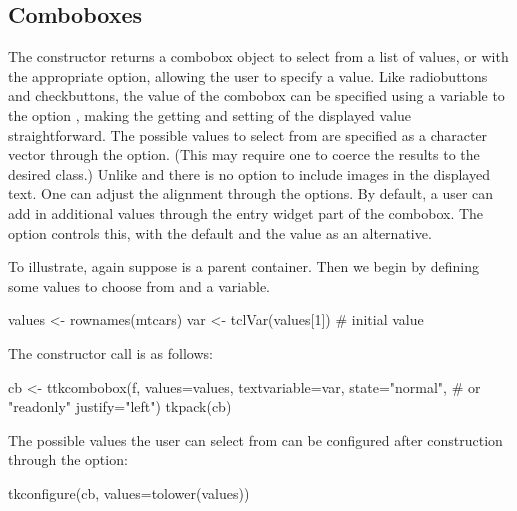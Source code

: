 \subsection{Comboboxes}
\label{sec:tcltk:comboboxes}

The  constructor returns a combobox object to
select from a list of values, or with the appropriate option, allowing
the user to specify a value. Like radiobuttons and checkbuttons, the
value of the combobox can be specified using a \TCL\/ variable to the
option , making the getting and
setting of the displayed value straightforward. The possible values to
select from are specified as a character vector through the
 option. (This may require one to coerce
the results to the desired class.) Unlike \GTK{} and \Qt{} there is no option to
include images in the displayed text. One can adjust the alignment
through the  options.  By default, a user
can add in additional values through the entry widget part of the
combobox. The  option controls this, with
the default   and the value  as an
alternative.

To illustrate, again suppose  is a parent container. Then we
begin by defining some values to choose from and a \TCL\/ variable.


\begin{Schunk}
\begin{Sinput}
 values <- rownames(mtcars)
 var <- tclVar(values[1])                # initial value
\end{Sinput}
\end{Schunk}

The constructor call is as follows:
\begin{Schunk}
\begin{Sinput}
 cb <- ttkcombobox(f,
                   values=values,
                   textvariable=var,
                   state="normal", # or "readonly"
                   justify="left")
 tkpack(cb)
\end{Sinput}
\end{Schunk}


The possible values the user can select from can be configured after
construction through the  option:
\begin{Schunk}
\begin{Sinput}
 tkconfigure(cb, values=tolower(values))
\end{Sinput}
\end{Schunk}


